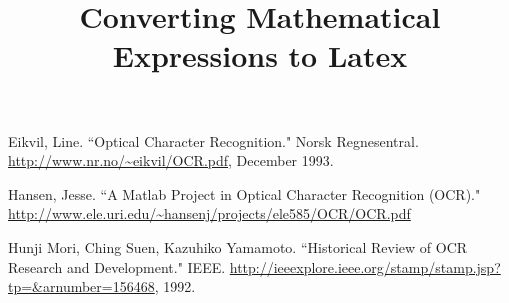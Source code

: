\documentclass{article}
\begin{document}
\sloppy
\fboxsep=0cm
\title{Converting Mathematical Expressions to Latex}

\address{Rose-Hulman Institute of Technology}
\maketitle

%

%

%

%

%



\begin{thebibliography}{1}

   Eikvil, Line. ``Optical Character Recognition." Norsk 		Regnesentral. \url{http://www.nr.no/~eikvil/OCR.pdf}, December 1993.

   Hansen, Jesse.  ``A Matlab Project in Optical Character Recognition (OCR)." \url{http://www.ele.uri.edu/~hansenj/projects/ele585/OCR/OCR.pdf}

    Hunji Mori, Ching Suen, Kazuhiko Yamamoto. ``Historical Review of OCR Research and Development." IEEE. \url{http://ieeexplore.ieee.org/stamp/stamp.jsp?tp=&arnumber=156468}, 1992.
\end{thebibliography}
\end{document}
